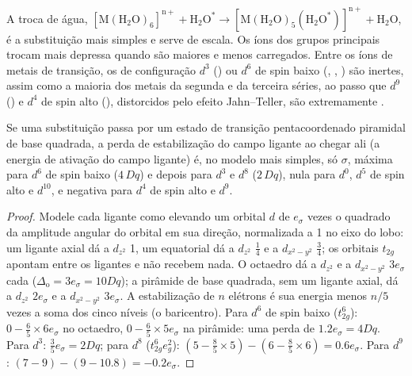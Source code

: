 A troca de água, $\mathrm{[M(H_2O)_6]^{n+} + H_2O^{\ast} \to [M(H_2O)_5(H_2O^{\ast})]^{n+} + H_2O}$, é a substituição mais
simples e serve de escala. Os íons dos grupos principais trocam mais depressa quando são
maiores e menos carregados. Entre os íons de metais de transição, os de configuração $d^3$
() ou $d^6$ de spin baixo (, , ) são inertes, assim como
a maioria dos metais da segunda e da terceira séries, ao passo que $d^9$ () e $d^4$ de spin alto (),
distorcidos pelo efeito Jahn--Teller, são extremamente .

\begin{proposition}\label{prop:b3:complex-mechanisms:lfae}
Se uma substituição passa por um estado de transição pentacoordenado piramidal de
base quadrada, a perda de estabilização do campo ligante ao chegar ali (a energia de
ativação do campo ligante) é, no modelo mais simples, só $\sigma$, máxima para $d^6$ de spin baixo
($4\,Dq$) e depois para $d^3$ e $d^8$ ($2\,Dq$), nula para $d^0$, $d^5$ de spin alto e $d^{10}$, e negativa
para $d^4$ de spin alto e $d^9$.
\end{proposition}

\begin{proof}
Modele cada ligante como elevando um orbital $d$ de $e_\sigma$ vezes o quadrado da amplitude
angular do orbital em sua direção, normalizada a 1 no eixo do lobo: um ligante
axial dá a $d_{z^2}$ 1, um equatorial dá a $d_{z^2}$ $\frac14$ e a $d_{x^2-y^2}$ $\frac34$; os orbitais $t_{2g}$ apontam
entre os ligantes e não recebem nada. O octaedro dá a $d_{z^2}$ e a $d_{x^2-y^2}$ $3e_\sigma$ cada
($\Delta_{\mathrm o} = 3e_\sigma = 10Dq$); a pirâmide de base quadrada, sem um ligante axial, dá a $d_{z^2}$ $2e_\sigma$ e a
$d_{x^2-y^2}$ $3e_\sigma$. A estabilização de $n$ elétrons é sua energia menos $n/5$ vezes a soma dos
cinco níveis (o baricentro). Para $d^6$ de spin baixo ($t_{2g}^6$): $0 - \frac65 \times 6e_\sigma$ no
octaedro, $0 - \frac65 \times 5e_\sigma$ na pirâmide: uma perda de $1.2e_\sigma = 4Dq$. Para $d^3$: $\frac35e_\sigma =
2Dq$; para $d^8$ ($t_{2g}^6e_g^2$): $(5 - \frac85 \times 5) - (6 - \frac85 \times 6) = 0.6e_\sigma$. Para $d^9$: $(7 - 9) - (9 -
10.8) = -0.2e_\sigma$.
\end{proof}

